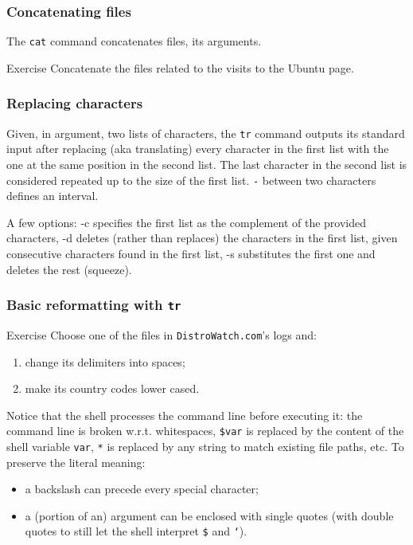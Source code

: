 \documentclass{beamer}
\begin{document}
\begin{frame}
  \frametitle{Concatenating files}
  The \texttt{cat} command concatenates files, its arguments.

  \vfill
  \pause

  \begin{exampleblock}{Exercise}
    Concatenate the files related to the visits to the Ubuntu page.
  \end{exampleblock}
\end{frame}

\begin{frame}
  \frametitle{Replacing characters}
  Given, in argument, two lists of characters, the \texttt{tr} command
  outputs its standard input after replacing (aka translating) every
  character in the first list with the one at the same position in the
  second list.  The last character in the second list is considered
  repeated up to the size of the first list.  \texttt{-} between two
  characters defines an interval.

  \vfill

  A few options: -c specifies the first list as the complement of the
  provided characters, -d deletes (rather than replaces) the
  characters in the first list, given consecutive characters found in
  the first list, -s substitutes the first one and deletes the rest
  (squeeze).
\end{frame}

\begin{frame}
  \frametitle{Basic reformatting with \texttt{tr}}
  \begin{exampleblock}{Exercise}
    Choose one of the files in \texttt{DistroWatch.com}'s logs and:
    \begin{enumerate}
    \item change its delimiters into spaces;
    \item make its country codes lower cased.
    \end{enumerate}
  \end{exampleblock}

  \vfill

  Notice that the shell processes the command line before executing
  it: the command line is broken w.r.t. whitespaces, \texttt{\$var} is
  replaced by the content of the shell variable \texttt{var},
  \texttt{*} is replaced by any string to match existing file paths,
  etc. To preserve the literal meaning:
  \begin{itemize}
  \item a backslash can precede every special character;
  \item a (portion of an) argument can be enclosed with single quotes
    (with double quotes to still let the shell interpret \texttt{\$}
    and \texttt{`}).
  \end{itemize}
\end{frame}
\end{document}
